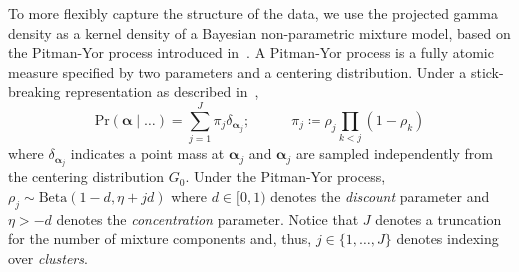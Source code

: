 To more flexibly capture the structure of the data, we use the projected gamma density 
    as a kernel density of a Bayesian non-parametric mixture model, based on 
    the Pitman-Yor process introduced in~\cite{perman1992}.  A Pitman-Yor process
    is a fully atomic measure specified by two parameters and a centering
    distribution.  Under a stick-breaking representation as described 
    in~\cite{ishwaran2001}, 
    \begin{equation}
        \label{eqn:stickbreak}
        \text{Pr}(\bm{\alpha}\mid\ldots) 
            = \sum_{j = 1}^J\pi_j\delta_{\bm{\alpha}_j};\;\hspace{1cm}\;
            \pi_j \coloneqq\rho_j\prod_{k < j}(1 - \rho_k)
    \end{equation}
    where $\delta_{\bm{\alpha}_j}$ indicates a point mass at $\bm{\alpha}_j$ and
    $\bm{\alpha}_j$ are sampled independently from the centering distribution $G_0$.
    Under the Pitman-Yor process, $\rho_j \sim \text{Beta}(1 - d, \eta + jd)$
    where $d \in [0, 1)$ denotes the \emph{discount} parameter and $\eta > -d$
    denotes the \emph{concentration} parameter. Notice that $J$ denotes a
    truncation for the number of mixture components and, thus, 
    $j\in \lbrace 1,\ldots,J\rbrace$ denotes indexing over \emph{clusters}.

